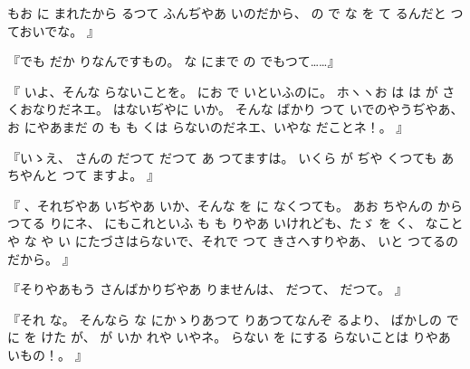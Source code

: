 もお
に
まれたから
るつて
ふんぢやあ
いのだから、
の
で
な
を
て
るんだと
つておいでな。
』

『でも
だか
りなんですもの。
な
にまで
の
でもつて……』

『
いよ、そんな
らないことを。
にお
で
いといふのに。
ホヽヽお
は
は
が
さくおなりだネエ。
はないぢやに
いか。
そんな
ばかり
つて
いでのやうぢやあ、お
にやあまだ
の
も
も
くは
らないのだネエ、いやな
だことネ！。
』

『いゝえ、
さんの
だつて
だつて
あ
つてますは。
いくら
が
ぢや
くつても
あちやんと
つて
ますよ。
』

『
、それぢやあ
いぢやあ
いか、そんな
を
に
なくつても。
あお
ちやんの
から
つてる
りにネ、
にもこれといふ
も
も
りやあ
いけれども、たゞ
を
く、
なことや
な
や
い
にたづさはらないで、それで
つて
きさへすりやあ、
いと
つてるのだから。
』

『そりやあもう
さんばかりぢやあ
りませんは、
だつて、
だつて。
』

『それ
な。
そんなら
な
にかゝりあつて
りあつてなんぞ
るより、
ばかしの
で
に
を
けた
が、
が
いか
れや
いやネ。
らない
を
にする
らないことは
りやあ
いもの！。
』

